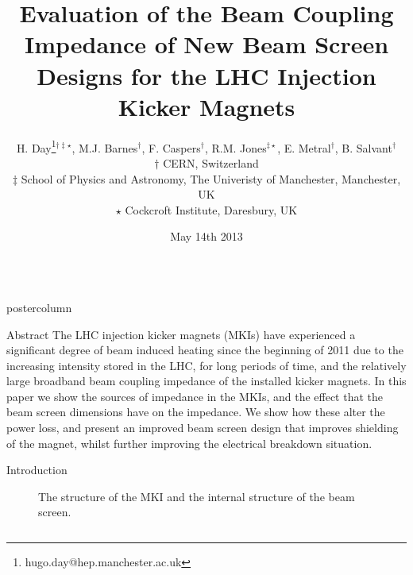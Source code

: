 \documentclass[final,hyperref={pdfpagelabels=false}]{beamer}
\title{	Evaluation of the Beam Coupling Impedance of New Beam Screen Designs for the LHC Injection Kicker Magnets}
\author{H. Day\thanks{hugo.day@hep.manchester.ac.uk}$^{\dagger\ddagger\star}$, M.J. Barnes$^{\dagger}$, F. Caspers$^{\dagger}$, R.M. Jones$^{\ddagger \star}$, E. Metral$^{\dagger}$, B. Salvant$^{\dagger}$ \\
$\dagger$ CERN, Switzerland \\
$\ddagger$ School of Physics and Astronomy, The Univeristy of Manchester, Manchester, UK \\
$\star$ Cockcroft Institute, Daresbury, UK \\}
\date[May 14th 2013]{May 14th 2013}
\newlength{\columnheight}
\begin{document}
\begin{frame}
  \begin{columns}
    \begin{column}{.49\textwidth}
      \begin{beamercolorbox}[center,wd=\textwidth]{postercolumn}
        \begin{minipage}[T]{.95\textwidth}  %
          \parbox[t][\columnheight]{\textwidth}{ %
            \begin{block}{Abstract}
\small{
The LHC injection kicker magnets (MKIs) have experienced a significant degree of beam induced heating since the beginning of 2011 due to the increasing intensity stored in the LHC, for long periods of time, and the relatively large broadband beam coupling impedance of the installed kicker magnets. In this paper we show the sources of impedance in the MKIs, and the effect that the beam screen dimensions have on the impedance. We show how these alter the power loss, and present an improved beam screen design that improves shielding of the magnet, whilst further improving the electrical breakdown situation.
}
\end{block}
            \vfill

	\begin{block}{Introduction}
\small{
\begin{figure}
\caption{ The structure of the MKI and  the internal structure of the beam screen.}

\end{figure}

}
\end{block}}
\end{minipage}
\end{beamercolorbox}
\end{column}
\end{columns}
\end{frame}
\end{document}
